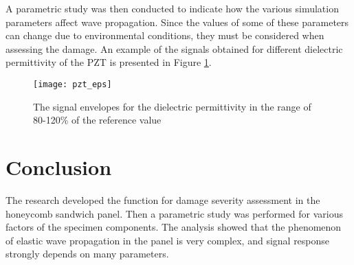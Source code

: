 \documentclass{article}
\begin{document}
A parametric study was then conducted to indicate how the various simulation parameters affect wave propagation. Since the values of some of these parameters can change due to environmental conditions, they must be considered when assessing the damage. An example of the signals obtained for different dielectric permittivity of the PZT is presented in Figure \ref{fig:pzt_eps}.
\begin{figure}
	\centering
	\texttt{[image: pzt\_eps]}
	\caption{The signal envelopes for the dielectric permittivity in the range of 80-120\% of the reference value}
	\label{fig:pzt_eps}
\end{figure}
\section*{Conclusion}
The research developed the function for damage severity assessment in the honeycomb sandwich panel. Then a parametric study was performed for various factors of the specimen components.
The analysis showed that the phenomenon of elastic wave propagation in the panel is very complex, and signal response strongly depends on many parameters.

\end{document}

